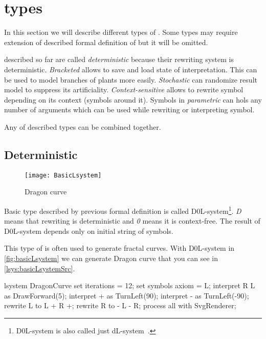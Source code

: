 
\section{\lsystem types}
\label{sec:lsysTypes}

In this section we will describe different types of \lsystems.
Some types may require extension of described formal definition of \lsystem but it will be omitted.

\lsystems described so far are called \emph{deterministic \lsystems} because their rewriting system is deterministic.
\emph{Bracketed \lsystems} allows to save and load state of interpretation.
This can be used to model branches of plants more easily.
\emph{Stochastic \lsystems} can randomize result model to suppress its artificiality.
\emph{Context-sensitive \lsystems} allows to rewrite symbol depending on its context (symbols around it).
Symbols in \emph{parametric \lsystems} can hols any number of arguments which can be used while rewriting or interpreting symbol.

Any of described types can be combined together.



\subsection{Deterministic \lsystems}

\newcommand{\dzerolsystem}{\mbox{D0L-system}\xspace}
\newcommand{\dlsystem}{\mbox{dL-system}\xspace}


\begin{wrapfigure}{r}{0.50\textwidth}
	\vspace{-30pt}
	\texttt{[image: BasicLsystem]}
	\caption{Dragon curve}
	\label{fig:basicLsystem}
\end{wrapfigure}


Basic \lsystem type described by previous formal definition is called \dzerolsystem\footnote{\dzerolsystem is also called just \dlsystem~\cite{Zar04}.}.
\emph{D} means that rewriting is deterministic and \emph{0} means it is context-free.
The result of \dzerolsystem depends only on initial string of symbols.

This type of \lsystem is often used to generate fractal curves.
With \dzerolsystem in \autoref{fig:basicLsystem} we can generate Dragon curve that you can see in \autoref{lsys:basicLsystemSrc}.

\begin{Lsystem}[label=lsys:basicLsystemSrc,caption={\dzerolsystem for generation of Dragon curve (\autoref{fig:basicLsystem})}]
lsystem DragonCurve {
	set iterations = 12;
	set symbols axiom = L;
	interpret R L as DrawForward(5);
	interpret + as TurnLeft(90);
	interpret - as TurnLeft(-90);
	rewrite L to L + R +;
	rewrite R to - L - R;
}
process all with SvgRenderer;
\end{Lsystem}


